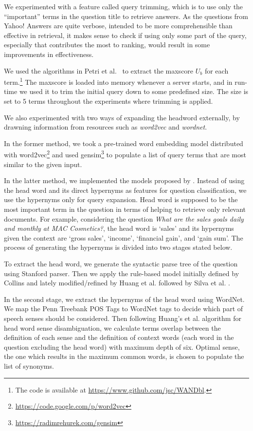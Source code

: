 \documentclass[a4paper,10pt,conference,compsocconf,final]{IEEEtran}
\newcommand\method[1]{{\sf\small{#1}}}
\begin{document}
{{{{We experimented with a feature called query trimming, which is to use only the
``important'' terms in the question title to retrieve answers.  As the
questions from Yahoo! Answers are quite verbose, intended to be more
comprehensible than effective in retrieval, it makes sense to check if using
only some part of the query, especially that contributes the most to ranking,
would result in some improvements in effectiveness.

We used the algorithms in Petri et al.~\cite{petri2013exploring,petri2014score}
to extract the maxscore $U_b$ for each term.\footnote{The code is available at
\url{https://www.github.com/jsc/WANDbl}.}  The maxscore is loaded into memory
whenever a server starts, and in run-time we used it to trim the initial query
down to some predefined size.  The size is set to 5 terms throughout the
experiments where trimming is applied.

We also experimented with two ways of expanding the headword externally, by
drawning information from resources such as \emph{word2vec} and \emph{wordnet}.  

In the former method, we took a pre-trained word embedding model distributed
with \method{word2vec}\footnote{\url{https://code.google.com/p/word2vec}} and
used \method{gensim}\footnote{\url{https://radimrehurek.com/gensim}} to
populate a list of query terms that are most similar to the given input.  

In the latter method, we implemented the models proposed by \cite{huang2008question, silva2011symbolic}. Instead of using the head word and its direct hypernyms as features for question classification, we use the hypernyms only for query expansion. Head word is supposed to be the most important term in the question in terms of helping to retrieve only relevant documents. For example, considering the question \textit{What are the sales goals daily and monthly at MAC Cosmetics?}, the head word is `sales' and its hypernyms given the context are `gross sales', `income', `financial gain', and `gain sum'. The process of generating the hypernyms is divided into two stages stated below.

To extract the head word, we generate the syntactic parse tree of the question using Stanford parser. Then we apply the rule-based model initially defined by Collins \cite{collins2003head} and lately modified/refined by Huang et al. \cite{huang2008question} followed by Silva et al. \cite{silva2011symbolic}.

In the second stage, we extract the hypernyms of the head word using WordNet. We map the Penn Treebank POS Tags to WordNet tags to decide which part of speech senses should be considered. Then following Huang's et al. \cite{huang2008question} algorithm for head word sense disambiguation, we calculate terms overlap between the definition of each sense and the definition of context words (each word in the question excluding the head word) with maximum depth of six. Optimal sense, the one which results in the maximum common words, is chosen to  populate the list of synonyms.

}}}}
\end{document}
